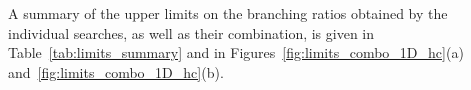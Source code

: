 
A summary of the upper limits on the branching ratios obtained by the individual searches, as well as their combination, is given  
in Table~\ref{tab:limits_summary} and in Figures~\ref{fig:limits_combo_1D_hc}(a) and~\ref{fig:limits_combo_1D_hc}(b).

